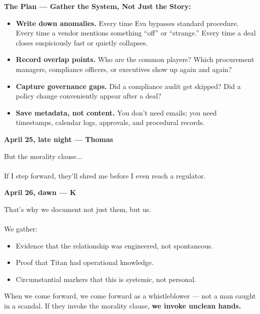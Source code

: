 \begin{JournalChat}
\begin{adjustwidth}{2em}{}
    \textbf{The Plan — Gather the System, Not Just the Story:}
    \begin{itemize}
        \item \textbf{Write down anomalies.}  
        Every time Eva bypasses standard procedure.  
        Every time a vendor mentions something “off” or “strange.”  
        Every time a deal closes suspiciously fast or quietly collapses.

        \item \textbf{Record overlap points.}  
        Who are the common players?  
        Which procurement managers, compliance officers, or executives show up again and again?

        \item \textbf{Capture governance gaps.}  
        Did a compliance audit get skipped?  
        Did a policy change conveniently appear after a deal?

        \item \textbf{Save metadata, not content.}  
        You don’t need emails; you need timestamps, calendar logs, approvals, and procedural records.
    \end{itemize}

\end{adjustwidth}

\vspace{1em}

\textbf{April 25, late night — Thomas}

\begin{adjustwidth}{2em}{}
    But the morality clause...
    \\\\
    If I step forward, they’ll shred me before I even reach a regulator.
\end{adjustwidth}

\vspace{1em}

\textbf{April 26, dawn — K}
\begin{adjustwidth}{2em}{}
    That’s why we document not just them, but us.
    \\\\
    We gather:
    \begin{itemize}
        \item Evidence that the relationship was engineered, not spontaneous.
        \item Proof that Titan had operational knowledge.
        \item Circumstantial markers that this is systemic, not personal.
    \end{itemize}
    When we come forward, we come forward as a whistleblower —  
    not a man caught in a scandal.
    If they invoke the morality clause,  
    \textbf{we invoke unclean hands.}
\end{adjustwidth}


\end{JournalChat}
